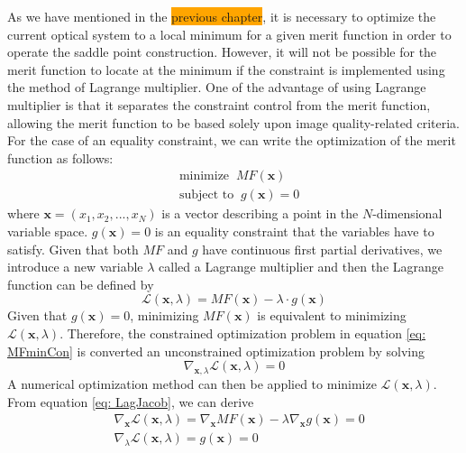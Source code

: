 As we have mentioned in the \colorbox{orange}{previous chapter}, it is necessary to optimize the current optical system to a local minimum for a given merit function in order to operate the saddle point construction. However, it will not be possible for the merit function to locate at the minimum if the constraint is implemented using the method of Lagrange multiplier. One of the advantage of using Lagrange multiplier is that it separates the constraint control from the merit function, allowing the merit function to be based solely upon image quality-related criteria. For the case of an equality constraint, we can write the optimization of the merit function as follows:
\setlength{\belowdisplayshortskip}{5pt}
\setlength{\abovedisplayshortskip}{5pt}
\begin{equation} \label{eq: MFminCon}
\begin{split}
& \text{minimize}\;\; MF(\textbf{x}) \\
& \text{subject to}\;\; g(\textbf{x}) = 0
\end{split}
\end{equation}
\noindent where $\textbf{x} = (x_1, x_2, ..., x_N)$ is a vector describing a point in the $N$-dimensional variable space. $g(\textbf{x})=0$ is an equality constraint that the variables have to satisfy. Given that both $MF$ and $g$ have continuous first partial derivatives, we introduce a new variable $\lambda$ called a Lagrange multiplier and then the Lagrange function can be defined by
\setlength{\belowdisplayshortskip}{5pt}
\setlength{\abovedisplayshortskip}{5pt}
\begin{equation} \label{eq: LagFun}
\mathcal{L}(\textbf{x},\lambda)=MF(\textbf{x})-\lambda\cdot g(\textbf{x})
\end{equation}
Given that $g(\textbf{x})=0$, minimizing $MF(\textbf{x})$ is equivalent to minimizing $\mathcal{L}(\textbf{x},\lambda)$. Therefore, the constrained optimization problem in equation \ref{eq: MFminCon} is converted an unconstrained optimization problem by solving 
\setlength{\belowdisplayshortskip}{5pt}
\setlength{\abovedisplayshortskip}{5pt}
\begin{equation} \label{eq: LagJacob}
\nabla_{\textbf{x},\lambda}\mathcal{L}(\textbf{x},\lambda)=0
\end{equation}
A numerical optimization method can then be applied to minimize $\mathcal{L}(\textbf{x},\lambda)$. From equation \ref{eq: LagJacob}, we can derive
\setlength{\belowdisplayshortskip}{5pt}
\setlength{\abovedisplayshortskip}{5pt}
\begin{subequations} 
\begin{align}
& \nabla_\textbf{x}\mathcal{L}(\textbf{x},\lambda)=\nabla_\textbf{x}MF(\textbf{x})-\lambda\nabla_\textbf{x}g(\textbf{x})=0 \label{eq: LagCondition1} \\
& \nabla_\lambda\mathcal{L}(\textbf{x},\lambda)=g(\textbf{x})=0 \label{eq: LagCondition2}
\end{align}
\end{subequations}
